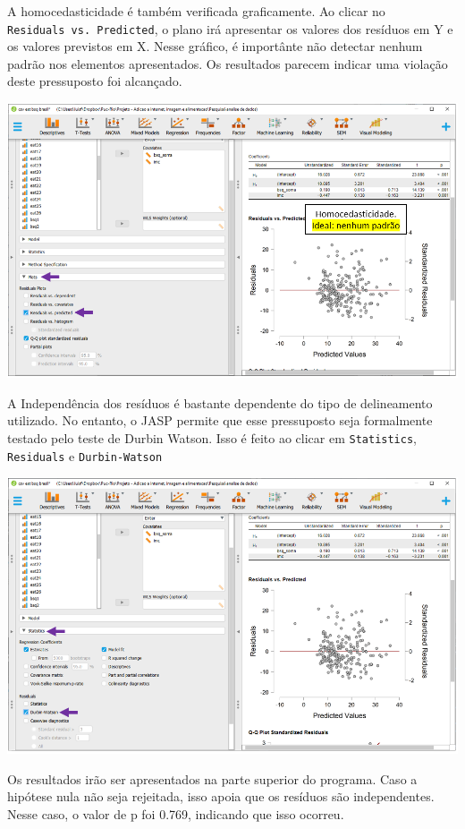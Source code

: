 \documentclass[
]{book}
\begin{document}
A homocedasticidade é também verificada graficamente. Ao clicar no \texttt{Residuals\ vs.\ Predicted}, o plano irá apresentar os valores dos resíduos em Y e os valores previstos em X. Nesse gráfico, é importânte não detectar nenhum padrão nos elementos apresentados. Os resultados parecem indicar uma violação deste pressuposto foi alcançado.

\includegraphics{./img/cap_reg_multipla_homocedasticidade.png}

A Independência dos resíduos é bastante dependente do tipo de delineamento utilizado. No entanto, o JASP permite que esse pressuposto seja formalmente testado pelo teste de Durbin Watson. Isso é feito ao clicar em \texttt{Statistics}, \texttt{Residuals} e \texttt{Durbin-Watson}

\includegraphics{./img/cap_reg_multipla_ind_residuos.png}

Os resultados irão ser apresentados na parte superior do programa. Caso a hipótese nula não seja rejeitada, isso apoia que os resíduos são independentes. Nesse caso, o valor de p foi 0.769, indicando que isso ocorreu.
\end{document}
